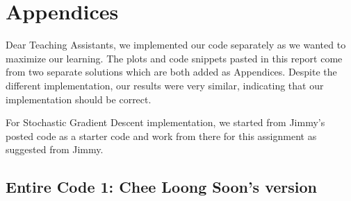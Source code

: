 \documentclass[a4paper,12pt]{article}
\begin{document}
\section{Appendices}
Dear Teaching Assistants, 
we implemented our code separately as we wanted to maximize our learning. The plots and code snippets pasted in this report come from two separate solutions which are both added as Appendices. Despite the different implementation, our results were very similar, indicating that our implementation should be correct. 

For Stochastic Gradient Descent implementation, we started from Jimmy's posted code as a starter code and work from there for this assignment as suggested from Jimmy. 

\subsection{Entire Code 1: Chee Loong Soon's version}
\end{document}
